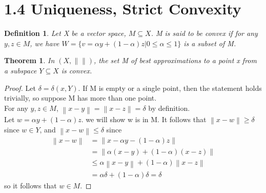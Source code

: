\documentclass[12pt]{extarticle}
\newcommand{\norm}[1]{\left\lVert #1 \right\rVert}
\newtheorem{definition}{Definition}
\newtheorem{theorem}{Theorem}
\begin{document}
\section*{1.4 Uniqueness, Strict Convexity}
\begin{definition}
	Let X be a vector space, $M\subseteq X$. M is said to be convex if for any $y,z\in M$, we have $W = \{v = \alpha y + (1-\alpha) z | 0 \leq\alpha\leq 1\}$ is a subset of M.
\end{definition}
\begin{theorem}
	In $(X, \norm{})$, the set M of best approximations to a point x from a subspace $Y\subseteq X$ is convex.
\end{theorem}
\begin{proof}
	Let $\delta = \delta(x,Y)$. If M is empty or a single point, then the statement holds trivially, so suppose M has more than one point.\\
	For any $y,z\in M$, $\norm{x-y} = \norm{x-z} = \delta$ by definition.\\
	Let $w = \alpha y + (1-\alpha)z$. we will show w is in M. It follows that $\norm{x-w} \geq \delta$ since $w\in Y$, and $\norm{x-w} \leq\delta$ since
	\begin{align*}
		\norm{x-w} &= \norm{x-\alpha y - (1-\alpha)z}\\
		&= \norm{\alpha(x-y) + (1-\alpha)(x-z)}\\
		&\leq \alpha\norm{x-y} + (1-\alpha)\norm{x-z}\\
		&= \alpha\delta + (1-\alpha)\delta = \delta
	\end{align*}
	so it follows that $w\in M$.
\end{proof}
\end{document}
